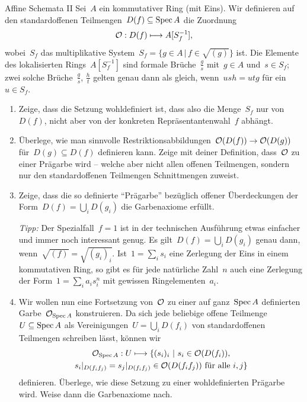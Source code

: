 \documentclass{uebblatt}
\begin{document}
\begin{aufgabe}{Affine Schemata II}
Sei~$A$ ein kommutativer Ring (mit Eins). Wir definieren auf den
standardoffenen Teilmengen~$D(f) \subseteq \operatorname{Spec} A$ die Zuordnung
\[ \mathcal{O} : D(f) \longmapsto A[S_f^{-1}], \]
wobei~$S_f$ das multiplikative System~$S_f = \{ g \in A \,|\, f \in \sqrt{(g)}
\}$ ist. Die Elemente des lokalisierten Rings~$A[S_f^{-1}]$
sind formale Brüche~$\frac{g}{s}$ mit~$g \in A$ und~$s \in S_f$; zwei solche
Brüche~$\frac{g}{s}$, $\frac{h}{t}$ gelten genau dann als gleich, wenn~$ush =
utg$ für ein~$u \in S_f$.

\begin{enumerate}
\item Zeige, dass die Setzung wohldefiniert ist, dass also die Menge~$S_f$ nur
von~$D(f)$, nicht aber von der konkreten Repräsentantenwahl~$f$ abhängt.

\item Überlege, wie man sinnvolle Restriktionsabbildungen~$\mathcal{O}(D(f)) \to
\mathcal{O}(D(g))$ für~$D(g) \subseteq D(f)$ definieren kann. Zeige mit deiner
Definition, dass~$\mathcal{O}$ zu einer Prägarbe wird -- welche aber nicht allen offenen
Teilmengen, sondern nur den standardoffenen Teilmengen Schnittmengen zuweist.
\item Zeige, dass die so definierte "`Prägarbe"' bezüglich offener
Überdeckungen der Form~$D(f) = \bigcup_i D(g_i)$ die Garbenaxiome erfüllt.

\emph{Tipp:} Der Spezialfall~$f = 1$ ist in der technischen Ausführung etwas
einfacher und immer noch interessant genug. Es gilt~$D(f) = \bigcup_i D(g_i)$
genau dann, wenn~$\sqrt{(f)} = \sqrt{(g_i)_i}$. Ist~$1 = \sum_i s_i$ eine Zerlegung
der Eins in einem kommutativen Ring, so gibt es für jede natürliche Zahl~$n$
auch eine Zerlegung der Form~$1 = \sum_i a_i s_i^n$ mit gewissen
Ringelementen~$a_i$.

\item Wir wollen nun eine Fortsetzung von~$\mathcal{O}$ zu einer auf ganz~$\operatorname{Spec} A$
definierten Garbe~$\mathcal{O}_{\operatorname{Spec} A}$ konstruieren. Da sich jede beliebige offene
Teilmenge~$U \subseteq \operatorname{Spec} A$ als Vereinigungen~$U = \bigcup_i D(f_i)$ von
standardoffenen Teilmengen schreiben lässt, können wir
\begin{multline*}
  \mathcal{O}_{\operatorname{Spec} A} : U \longmapsto \{ (s_i)_i \ |\
  \text{$s_i \in \mathcal{O}(D(f_i))$,} \\
  \text{$s_i|_{D(f_i f_j)} = s_j|_{D(f_i f_j)} \in \mathcal{O}(D(f_if_j))$ für alle~$i,j$} \}
\end{multline*}
definieren. Überlege, wie diese Setzung zu einer wohldefinierten Prägarbe wird.
Weise dann die Garbenaxiome nach.


\end{enumerate}
\end{aufgabe}
\end{document}
